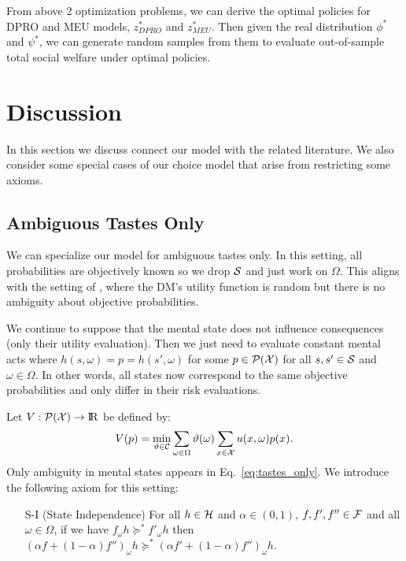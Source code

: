\documentclass[11pt,oneside]{article}
\theoremstyle{plain}
\theoremstyle{plain}
\theoremstyle{plain}
\theoremstyle{plain}
\theoremstyle{plain}
\theoremstyle{definition}
\theoremstyle{definition}
\theoremstyle{remark}
\theoremstyle{plain}
\newcommand{\R}{{\rm I\!R}}
\newcommand{\F}{{\cal F}}
\newcommand{\calpx}{{\cal P}({\cal X})}
\newcommand{\mcs}{{\cal S}}
\newcommand{\mcx}{{\cal X}}
\newcommand{\pfs}{\succeq^*}
\newcommand{\convmix}[2]{\alpha #1 + (1-\alpha) #2}
\newcommand{\omix}[2]{#1_\omega #2 }
\begin{document}
From above 2 optimization problems, we can derive the optimal policies for DPRO and MEU models, $z^*_{DPRO}$ and $z^*_{MEU}$. Then given the real distribution $\phi^*$ and $\psi^*$, 
we can generate random samples from them to evaluate out-of-sample total social welfare under optimal policies.

\section{Discussion}
\label{sec:discussion}

In this section we discuss connect our model with the related literature. We also consider some special cases of our choice model that arise from restricting some axioms.


\subsection{Ambiguous Tastes Only}

We can specialize our model for ambiguous tastes only. In this setting, all probabilities are objectively known so we drop $\mcs$ and just work on $\Omega$.
This aligns with the setting of \cite{hu2024distributional}, where the DM's utility function is random but there is no ambiguity about objective probabilities. 

We continue to suppose that the mental state does not influence consequences (only their utility evaluation). Then we just need to evaluate constant mental acts where $h(s,\omega) = p = h(s',\omega)$ for some $p \in \calpx$ for all $s ,s'\in \mcs$ and $\omega \in \Omega$.
In other words, all states now correspond to the same objective probabilities and only differ in their risk evaluations.

Let $V : \calpx \rightarrow \R$ be defined by:
%
\begin{equation}
\label{eq:tastes_only}
V(p) = \min_{\vartheta \in {\cal C}} \sum_{\omega \in \Omega} \vartheta(\omega) \sum_{x\in \mcx} u(x,\omega) p(x).
\end{equation}
%
Only ambiguity in mental states appears in Eq.~\eqref{eq:tastes_only}. 
We introduce the following axiom for this setting:
%
\begin{itemize}
    \item[S-I] (State Independence) For all $h\in {\cal H}$ and $\alpha \in (0,1)$, $f,f', f'' \in \F$ and all $\omega \in \Omega$, if we have
    $\omix{f}{h} \pfs \omix{f'}{h}$ then $\omix{\left(\convmix{f}{f''}\right)}{h} \pfs \omix{\left(\convmix{f'}{f''}\right)}{h}$.
\end{itemize}
%
\end{document}
